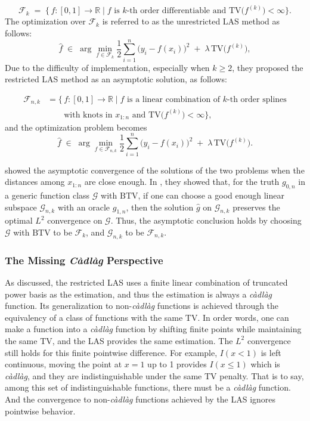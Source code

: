 \[
\mathcal{F}_k
\;=\;
\bigl\{\,f : [0,1]\to\mathbb{R}
\;\big|\;
f\text{ is $k$-th order differentiable and }
\mathrm{TV}\bigl(f^{(k)}\bigr)<\infty
\bigr\}.
\]
The optimization over $\mathcal{F}_k$ is referred to as the unrestricted LAS method as follows:
\begin{equation}\label{eq:ula-spline}
\hat f \;\in\;\arg\min_{f\in\mathcal{F}_k}
\frac{1}{2}\sum_{i=1}^n \bigl(y_i - f(x_i)\bigr)^2
\;+\;\lambda\,\mathrm{TV}\bigl(f^{(k)}\bigr),
\end{equation}
Due to the difficulty of implementation, especially when $k \ge 2$, they proposed the restricted LAS method as an asymptotic solution, as follows:

\begin{align*}
\mathcal{F}_{n,k}
&=
\bigl\{\,f:[0,1]\to\mathbb{R}
\;\big|\;
f\text{ is a linear combination of $k$-th order splines} \\
&\qquad\text{with knots in }x_{1:n}\text{ and }
\mathrm{TV}\bigl(f^{(k)}\bigr)<\infty
\bigr\},
\end{align*}
and the optimization problem becomes
\begin{equation}\label{eq:rla-spline}
\hat f \;\in\;\arg\min_{f\in\mathcal{F}_{n,k}}
\frac{1}{2}\sum_{i=1}^n \bigl(y_i - f(x_i)\bigr)^2
\;+\;\lambda\,\mathrm{TV}\bigl(f^{(k)}\bigr).
\end{equation}

\citet{mammen1997locally} showed the asymptotic convergence of the solutions of the two problems when the distances among $x_{1:n}$ are close enough. In \citet[Theorem~9]{mammen1997locally}, they showed that, for the truth $g_{0,n}$ in a generic function class $\mathcal{G}$ with $\mathrm{BTV}$, if one can choose a good enough linear subspace $\mathcal{G}_{n,k}$ with an oracle $g_{1,n}$, then the solution $\hat{g}$ on $\mathcal{G}_{n,k}$ preserves the optimal $L^2$ convergence on $\mathcal{G}$. Thus, the asymptotic conclusion holds by choosing $\mathcal{G}$ with $\mathrm{BTV}$ to be $\mathcal{F}_{k}$, and $\mathcal{G}_{n,k}$ to be $\mathcal{F}_{n,k}$.

\subsubsection{The Missing \emph{C\`adl\`ag} Perspective}
As discussed, the restricted LAS uses a finite linear combination of truncated power basis as the estimation, and thus the estimation is always a \emph{c\`adl\`ag} function. Its generalization to non-\emph{c\`adl\`ag} functions is achieved through the equivalency of a class of functions with the same $\mathrm{TV}$. In order words, one can make a function into a \emph{c\`adl\`ag} function by shifting finite points while maintaining the same $\mathrm{TV}$, and the LAS provides the same estimation. The $L^2$ convergence still holds for this finite pointwise difference. For example, $I(x<1)$ is left continuous, moving the point at $x = 1$ up to 1 provides $I(x \le 1)$ which is \emph{c\`adl\`ag}, and they are indistinguishable under the same TV penalty. That is to say, among this set of indistinguishable functions, there must be a \emph{c\`adl\`ag} function. And the convergence to non-\emph{c\`adl\`ag} functions achieved by the LAS ignores pointwise behavior.

